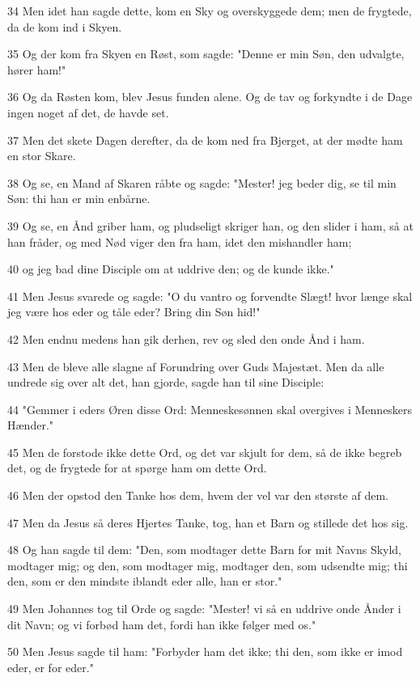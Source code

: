 \par 34 Men idet han sagde dette, kom en Sky og overskyggede dem; men de frygtede, da de kom ind i Skyen.
\par 35 Og der kom fra Skyen en Røst, som sagde: "Denne er min Søn, den udvalgte, hører ham!"
\par 36 Og da Røsten kom, blev Jesus funden alene. Og de tav og forkyndte i de Dage ingen noget af det, de havde set.
\par 37 Men det skete Dagen derefter, da de kom ned fra Bjerget, at der mødte ham en stor Skare.
\par 38 Og se, en Mand af Skaren råbte og sagde: "Mester! jeg beder dig, se til min Søn: thi han er min enbårne.
\par 39 Og se, en Ånd griber ham, og pludseligt skriger han, og den slider i ham, så at han fråder, og med Nød viger den fra ham, idet den mishandler ham;
\par 40 og jeg bad dine Disciple om at uddrive den; og de kunde ikke."
\par 41 Men Jesus svarede og sagde: "O du vantro og forvendte Slægt! hvor længe skal jeg være hos eder og tåle eder? Bring din Søn hid!"
\par 42 Men endnu medens han gik derhen, rev og sled den onde Ånd i ham.
\par 43 Men de bleve alle slagne af Forundring over Guds Majestæt. Men da alle undrede sig over alt det, han gjorde, sagde han til sine Disciple:
\par 44 "Gemmer i eders Øren disse Ord: Menneskesønnen skal overgives i Menneskers Hænder."
\par 45 Men de forstode ikke dette Ord, og det var skjult for dem, så de ikke begreb det, og de frygtede for at spørge ham om dette Ord.
\par 46 Men der opstod den Tanke hos dem, hvem der vel var den største af dem.
\par 47 Men da Jesus så deres Hjertes Tanke, tog, han et Barn og stillede det hos sig.
\par 48 Og han sagde til dem: "Den, som modtager dette Barn for mit Navns Skyld, modtager mig; og den, som modtager mig, modtager den, som udsendte mig; thi den, som er den mindste iblandt eder alle, han er stor."
\par 49 Men Johannes tog til Orde og sagde: "Mester! vi så en uddrive onde Ånder i dit Navn; og vi forbød ham det, fordi han ikke følger med os."
\par 50 Men Jesus sagde til ham: "Forbyder ham det ikke; thi den, som ikke er imod eder, er for eder."
